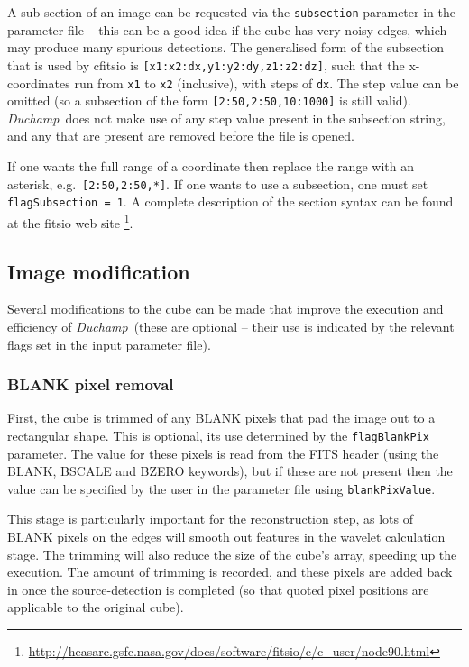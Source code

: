 \documentclass[12pt,a4paper]{article}
\newcommand{\eg}{e.g.\ }
\newcommand{\duchamp}{\emph{Duchamp}}
\begin{document}
A sub-section of an image can be requested via the \texttt{subsection}
parameter in the parameter file -- this can be a good idea if the cube
has very noisy edges, which may produce many spurious detections. The
generalised form of the subsection that is used by {\sc cfitsio} is
\texttt{[x1:x2:dx,y1:y2:dy,z1:z2:dz]}, such that the x-coordinates run
from \texttt{x1} to \texttt{x2} (inclusive), with steps of
\texttt{dx}. The step value can be omitted (so a subsection of the
form \texttt{[2:50,2:50,10:1000]} is still valid). \duchamp\ does not
make use of any step value present in the subsection string, and any
that are present are removed before the file is opened.

If one wants the full range of a coordinate then replace the range
with an asterisk, \eg \texttt{[2:50,2:50,*]}. If one wants to use a
subsection, one must set \texttt{flagSubsection = 1}. A complete
description of the section syntax can be found at the {\sc fitsio} web
site
\footnote{
\href{http://heasarc.gsfc.nasa.gov/docs/software/fitsio/c/c\_user/node90.html}%
{http://heasarc.gsfc.nasa.gov/docs/software/fitsio/c/c\_user/node90.html}}.

\subsection{Image modification}
\label{sec-modify}

Several modifications to the cube can be made that improve the
execution and efficiency of \duchamp\ (these are optional -- their
use is indicated by the relevant flags set in the input parameter
file).

\subsubsection{BLANK pixel removal}

First, the cube is trimmed of any BLANK pixels that pad the image out
to a rectangular shape. This is optional, its use determined by the
\texttt{flagBlankPix} parameter. The value for these pixels is read from
the FITS header (using the BLANK, BSCALE and BZERO keywords), but if
these are not present then the value can be specified by the user in
the parameter file using \texttt{blankPixValue}.

This stage is particularly important for the reconstruction step, as
lots of BLANK pixels on the edges will smooth out features in the
wavelet calculation stage. The trimming will also reduce the size of
the cube's array, speeding up the execution. The amount of trimming is
recorded, and these pixels are added back in once the source-detection
is completed (so that quoted pixel positions are applicable to the
original cube).
\end{document}
